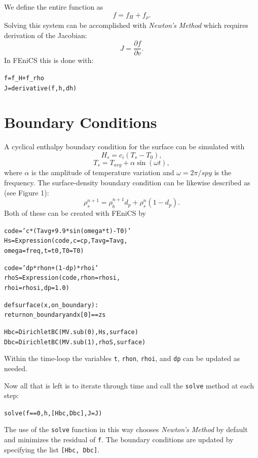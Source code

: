 \documentclass{article}%
\begin{document}
We define the entire function as 
  $$
    f = f_H + f_{\rho}.
  $$
Solving this system can be accomplished with \emph{Newton's Method} which requires derivation of the Jacobian:
  $$
    J = \frac{\partial f}{\partial v}.
  $$
In FEniCS this is done with:
\footnotesize
\begin{alltt}
f  = f_H + f_rho
J  = derivative(f, h, dh)
\end{alltt}
\normalsize


\section{Boundary Conditions}

A cyclical enthalpy boundary condition for the surface can be simulated with 
  $$
    H_s = c_i ( T_s - T_0 ),
  $$
  $$
    T_s = T_{avg} + \alpha \sin(\omega t),
  $$
where $\alpha$ is the amplitude of temperature variation and $\omega = 2\pi / spy$ is the frequency.  The surface-density boundary condition can be likewise described as (see Figure 1): 
  $$
    \rho_s^{n+1} = \rho_{\dot{b}}^{n+1} d_p + \rho_s^{n} (1 - d_p).
  $$
Both of these can be created with FEniCS by
\footnotesize
\begin{alltt}
code = 'c*(Tavg + 9.9*sin(omega*t) - T0)'
Hs   = Expression(code, c=cp, Tavg=Tavg, 
                  omega=freq, t=t0, T0=T0)

code = 'dp*rhon + (1 - dp)*rhoi'
rhoS = Expression(code, rhon=rhosi, 
                  rhoi=rhosi, dp=1.0)

def surface(x, on_boundary):
  return on_boundary and x[0] == zs

Hbc  = DirichletBC(MV.sub(0), Hs, surface)
Dbc  = DirichletBC(MV.sub(1), rhoS, surface)
\end{alltt}
\normalsize
Within the time-loop the variables \texttt{t}, \texttt{rhon}, \texttt{rhoi}, and \texttt{dp} can be updated as needed.

Now all that is left is to iterate through time and call the \texttt{solve} method at each step:\par
\footnotesize
\begin{alltt}
solve(f == 0, h, [Hbc, Dbc], J=J)
\end{alltt}
\normalsize
The use of the \texttt{solve} function in this way chooses \emph{Newton's Method} by default and minimizes the residual of \texttt{f}.  The boundary conditions are updated by specifying the list \texttt{[Hbc, Dbc]}.
\end{document}
